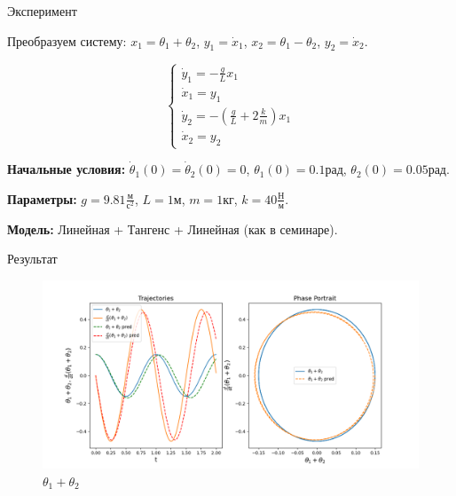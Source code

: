 \documentclass{beamer}
\begin{document}
\begin{frame}{Эксперимент}

    Преобразуем систему: $x_1 = \theta_1 + \theta_2$, $y_1 = \dot x_1$, $x_2 = \theta_1 - \theta_2$, $y_2 = \dot x_2$.

    \begin{equation*}
        \begin{cases}
            \dot y_1 = - \frac{g}{L} x_1\\
            \dot x_1 = y_1\\
            \dot y_2 = - (\frac{g}{L} + 2 \frac{k}{m}) x_1\\
            \dot x_2 = y_2
        \end{cases}
    \end{equation*}

    \textbf{Начальные условия:} $\dot \theta_1(0) = \dot \theta_2(0) = 0$, $\theta_1(0) = 0.1 \text{рад}$, $\theta_2(0) = 0.05 \text{рад}$. 
    
    \textbf{Параметры:} $g = 9.81 \frac{\text{м}}{\text{с}^2}$, $L = 1 \text{м}$, $m = 1 \text{кг}$, $k = 40 \frac{\text{Н}}{\text{м}}$.

    \textbf{Модель:} Линейная + Тангенс + Линейная (как в семинаре).
    
\end{frame}


\begin{frame}{Результат}

    \begin{figure}
        \centering
        \includegraphics[width = 1 \textwidth]{images/Graph_sum.png}
        \caption{$\theta_1 + \theta_2$}
    \end{figure}

\end{frame}
\end{document}
